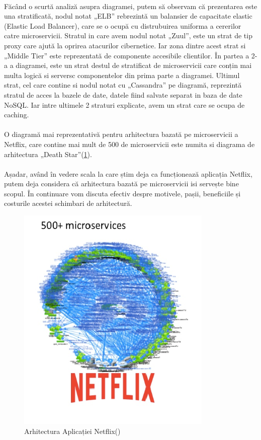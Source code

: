 \documentclass[12pt]{report}
\begin{document}
  	\paragraph{}Făcând o scurtă analiză asupra diagramei, putem să observam că prezentarea este una stratificată, nodul notat „ELB” rebrezintă un balansier de capacitate elastic (Elastic Load Balancer), care se o ocupă cu distrubuirea uniforma a cererilor catre microservicii. Stratul in care avem nodul notat „Zuul”, este un strat de tip proxy care ajută la oprirea atacurilor cibernetice. Iar zona dintre acest strat si „Middle Tier” este reprezentată de componente accesibile clientilor. În partea a 2-a a diagramei, este un strat destul de stratificat de microservicii care conțin mai multa logică si serversc componentelor din prima parte a diagramei. Ultimul strat, cel care contine si nodul notat cu „Cassandra” pe diagramă, reprezintă stratul de acces la bazele de date, datele fiind salvate separat in baza de date NoSQL. Iar intre ultimele 2 straturi   explicate, avem un strat care se ocupa de caching.
  	\paragraph{}O diagramă mai reprezentativă pentru arhitectura bazată pe microservicii a Netflix, care contine mai mult de 500 de microservicii este numita si diagrama de arhitectura „Death Star”(\ref{deathStarArhitecture}).
  	\paragraph{}Așadar, având în vedere scala la care știm deja ca funcționează aplicația Netflix, putem deja considera că arhitectura bazată pe microservicii isi servește bine scopul. În continuare vom discuta efectiv despre motivele, pașii, beneficiile și costurile acestei schimbari de arhitectură.
  	\begin{figure}[h]
  	\centering
  	\includegraphics[scale=.8]{deathstararhitecture}
	\caption{Arhitectura Aplicației Netflix()}  
	\label{deathStarArhitecture}
  	\end{figure}
\end{document}
